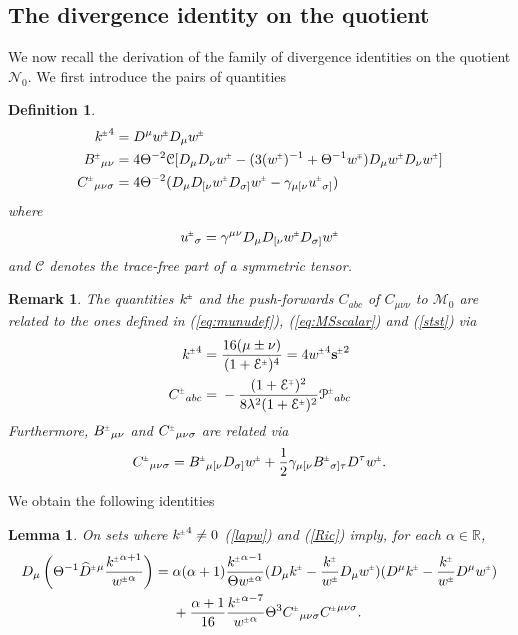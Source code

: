 \documentclass[a4paper,11pt,reqno]{amsart}
\newcommand{\cE}{\mathcal{E}}
\newcommand{\cM}{\mathcal{M}}
\newcommand{\cN}{\mathcal{N}}
\newcommand{\wh}{\widehat}
\newcommand{\Th}{\Theta}
\newcommand{\al}{\alpha}
\newcommand{\si}{\sigma}
\theoremstyle{plain}
\newtheorem{lemma}[thm]{Lemma}
\newtheorem{definition}[thm]{Definition}
\newtheorem{remark}[thm]{Remark}
\newcommand{\PM}[1]{{{#1}^{\hspace{-.5pt}\scaleto{\pm}{3.5pt}}}}
\newcommand{\MP}[1]{{{#1}^{\hspace{-.5pt}\scaleto{\mp}{3.5pt}}}}
\def\sbold{\mathbf{s}}
\numberwithin{equation}{section}
\begin{document}
\subsection{The divergence identity on the quotient}
We now recall the derivation of the family of  divergence identities on the quotient $\cN_0$.  
\label{sec:divid}
 We first introduce  the pairs of quantities
\begin{definition}
\begin{align} \label{k}  
\PM{k}^{4} ={}& D^{\mu} \PM{w} D_{\mu}\PM{w} \\
\label{b}
 \PM{B}_{\mu\nu} ={}& 4\Theta^{-2}\mathcal{C}[D_{\mu}D_{\nu}\PM{w} - (3(\PM{w})^{-1} +
  \Theta^{-1} \MP{w})D_{\mu}\PM{w} D_{\nu}\PM{w}] \\
\label{c}
\PM{C}_{\mu\nu\si} ={}& 4\Theta^{-2}(D_{\mu}D_{[\nu}\PM{w}D_{\sigma]}\PM{w} -
  \gamma_{\mu[\nu} \PM{u}_{\sigma]})
\end{align}
where 
\begin{equation} \label{u}
\PM{u}_{\si} = \gamma^{\mu\nu} D_{\mu} D_{[\nu} \PM{w} D_{\si]} \PM{w}
\end{equation}
and  $\mathcal{ C}$ denotes the trace-free part of a symmetric tensor.
\end{definition}
\begin{remark}
The quantities $\PM{k}$ and the push-forwards $C_{abc}$ of $C_{\mu\nu\nu}$ to ${\cM}_0$ are related to the ones defined in  (\ref{eq:munudef}), (\ref{eq:MSscalar}) and (\ref{stst}) 
via
\begin{align}
\PM{k}^4  ={}& \frac{16 (\mu \pm \nu)}{(1 + \PM{\cE})^4} = 4 \PM{w}^4 \PM{\sbold}^2 \\
\PM{C}_{abc}  ={}& -  \frac{(1 + \MP{\cE})^2}{8 \lambda^2 (1 + \PM{\cE})^2} \PM{\mathcal{P}}_{abc}
\end{align}
Furthermore, $\PM{B}_{\mu\nu}$ and $\PM{C}_{\mu\nu\si}$ are related via 
\begin{align}
\PM{C}_{\mu\nu\si} = \PM{B}_{\mu[\nu} D_{\si]}\PM{w} + \frac{1}{2} \gamma_{\mu[\nu} \PM{B}_{\si]\tau} D^{\tau} \PM{w}.
\end{align}
\end{remark}
%
%
We obtain  the following identities  \cite{simon:1995}

\begin{lemma}
\label{lem:divid}
On sets where $\PM{k}^{4} \ne 0$ (\ref{lapw}) and (\ref{Ric}) imply,
for each $\al \in \mathbb{R}$,
\begin{align}
\label{ddkw}
D_{\mu}\left(\Th^{-1}  \PM{\wh D}{}^{\mu} \frac{\PM{k}^{\al + 1}}{\PM{w}^\al} \right)
={}& \al (\al + 1) \frac{\PM{k}^{\al - 1}}
{\Theta \PM{w}^{\al}}
(D_{\mu} \PM{k} - \frac{\PM{k}}{\PM{w}}D_{\mu}\PM{w})
(D^{\mu} \PM{k} - \frac{\PM{k}}{\PM{w}}D^{\mu}\PM{w})
\nonumber \\
& +\frac{\al + 1}{16} \frac{\PM{k}^{\al - 7}}{\PM{w}^{\al}}
\Theta^{3} \PM{C}_{\mu\nu\si} \PM{C}^{\mu\nu\si}.
\end{align}
\end{lemma}
\end{document}
